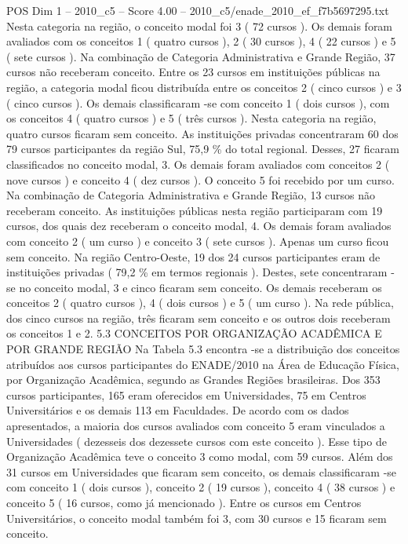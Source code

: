 \begin{textsample}{POS Dim 1 – 2010\_c5 – Score 4.00 – 2010\_c5/enade\_2010\_ef\_f7b5697295.txt}
Nesta categoria na região, o conceito modal foi 3 ( 72 cursos ).
Os demais foram avaliados com os conceitos 1 ( quatro cursos ), 2 ( 30 cursos ), 4 ( 22 cursos ) e 5 ( sete cursos ).
Na combinação de Categoria Administrativa e Grande Região, 37 cursos não receberam conceito.
Entre os 23 cursos em instituições públicas na região, a categoria modal ficou distribuída entre os conceitos 2 ( cinco cursos ) e 3 ( cinco cursos ).
Os demais classificaram -se com conceito 1 ( dois cursos ), com os conceitos 4 ( quatro cursos ) e 5 ( três cursos ).
Nesta categoria na região, quatro cursos ficaram sem conceito.
As instituições privadas concentraram 60 dos 79 cursos participantes da região Sul, 75,9 \% do total regional.
Desses, 27 ficaram classificados no conceito modal, 3.
Os demais foram avaliados com conceitos 2 ( nove cursos ) e conceito 4 ( dez cursos ).
O conceito 5 foi recebido por um curso.
Na combinação de Categoria Administrativa e Grande Região, 13 cursos não receberam conceito.
As instituições públicas nesta região participaram com 19 cursos, dos quais dez receberam o conceito modal, 4.
Os demais foram avaliados com conceito 2 ( um curso ) e conceito 3 ( sete cursos ).
Apenas um curso ficou sem conceito.
Na região Centro-Oeste, 19 dos 24 cursos participantes eram de instituições privadas ( 79,2 \% em termos regionais ).
Destes, sete concentraram -se no conceito modal, 3 e cinco ficaram sem conceito.
Os demais receberam os conceitos 2 ( quatro cursos ), 4 ( dois cursos ) e 5 ( um curso ).
Na rede pública, dos cinco cursos na região, três ficaram sem conceito e os outros dois receberam os conceitos 1 e 2. 5.3 CONCEITOS POR ORGANIZAÇÃO ACADÊMICA E POR GRANDE REGIÃO Na Tabela 5.3 encontra -se a distribuição dos conceitos atribuídos aos cursos participantes do ENADE/2010 na Área de Educação Física, por Organização Acadêmica, segundo as Grandes Regiões brasileiras.
Dos 353 cursos participantes, 165 eram oferecidos em Universidades, 75 em Centros Universitários e os demais 113 em Faculdades.
De acordo com os dados apresentados, a maioria dos cursos avaliados com conceito 5 eram vinculados a Universidades ( dezesseis dos dezessete cursos com este conceito ).
Esse tipo de Organização Acadêmica teve o conceito 3 como modal, com 59 cursos.
Além dos 31 cursos em Universidades que ficaram sem conceito, os demais classificaram -se com conceito 1 ( dois cursos ), conceito 2 ( 19 cursos ), conceito 4 ( 38 cursos ) e conceito 5 ( 16 cursos, como já mencionado ).
Entre os cursos em Centros Universitários, o conceito modal também foi 3, com 30 cursos e 15 ficaram sem conceito.

\end{textsample}
